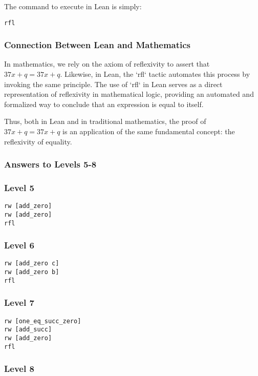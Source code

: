 \documentclass{article}
\theoremstyle{theorem}
\theoremstyle{definition}
\theoremstyle{remark}
\begin{document}
The command to execute in Lean is simply:
\begin{verbatim}
rfl
\end{verbatim}

\subsubsection*{Connection Between Lean and Mathematics}

In mathematics, we rely on the axiom of reflexivity to assert that $37x + q = 37x + q$. Likewise, in Lean, the `rfl` tactic automates this process by invoking the same principle. The use of `rfl` in Lean serves as a direct representation of reflexivity in mathematical logic, providing an automated and formalized way to conclude that an expression is equal to itself.

Thus, both in Lean and in traditional mathematics, the proof of $37x + q = 37x + q$ is an application of the same fundamental concept: the reflexivity of equality.

\subsubsection*{Answers to Levels 5-8}

\subsubsection*{Level 5}

\begin{verbatim}
rw [add_zero]
rw [add_zero]
rfl
\end{verbatim}

\subsubsection*{Level 6}

\begin{verbatim}
rw [add_zero c]
rw [add_zero b]
rfl
\end{verbatim}

\subsubsection*{Level 7}

\begin{verbatim}
rw [one_eq_succ_zero]
rw [add_succ]
rw [add_zero]
rfl
\end{verbatim}

\subsubsection*{Level 8}
\end{document}
